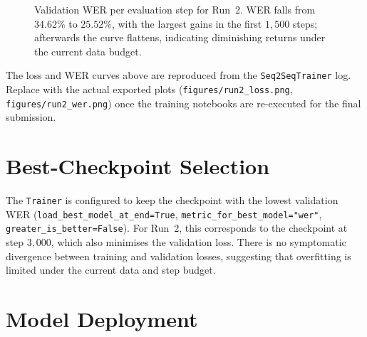 \begin{figure}[H]
  \centering
  \caption[Validation WER curve (Run 2)]{Validation WER per evaluation
  step for Run~2. WER falls from $34.62\%$ to $25.52\%$, with the
  largest gains in the first $1{,}500$ steps; afterwards the curve
  flattens, indicating diminishing returns under the current data
  budget.}
  \label{fig:mt_run2_wer}
\end{figure}

\begin{infobox}[title=Note on the curves]
The loss and WER curves above are reproduced from the
\texttt{Seq2SeqTrainer} log. Replace with the actual exported plots
(\texttt{figures/run2\_loss.png}, \texttt{figures/run2\_wer.png}) once
the training notebooks are re-executed for the final submission.
\end{infobox}

\section{Best-Checkpoint Selection}

The \texttt{Trainer} is configured to keep the checkpoint with the
lowest validation WER (\texttt{load\_best\_model\_at\_end=True},
\texttt{metric\_for\_best\_model="wer"}, \texttt{greater\_is\_better=False}).
For Run~2, this corresponds to the checkpoint at step $3{,}000$, which
also minimises the validation loss. There is no symptomatic divergence
between training and validation losses, suggesting that overfitting is
limited under the current data and step budget.

\section{Model Deployment}

